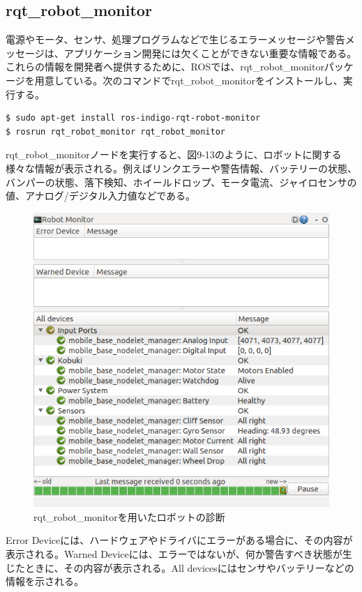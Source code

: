 \begin{itemize}
\subsection{rqt\_robot\_monitor}

電源やモータ、センサ、処理プログラムなどで生じるエラーメッセージや警告メッセージは、アプリケーション開発には欠くことができない重要な情報である。これらの情報を開発者へ提供するために、ROSでは、rqt\_robot\_monitorパッケージを用意している。次のコマンドでrqt\_robot\_monitorをインストールし、実行する。

\begin{lstlisting}[language=ROS]
$ sudo apt-get install ros-indigo-rqt-robot-monitor
$ rosrun rqt_robot_monitor rqt_robot_monitor
\end{lstlisting}

rqt\_robot\_monitorノードを実行すると、図9-13のように、ロボットに関する様々な情報が表示される。例えばリンクエラーや警告情報、バッテリーの状態、バンパーの状態、落下検知、ホイールドロップ、モータ電流、ジャイロセンサの値、アナログ/デジタル入力値などである。

\begin{figure}[htp]
  \centering
  \includegraphics[width=12cm]{pictures/chapter9/pic_09_13.png}
  \caption{rqt\_robot\_monitorを用いたロボットの診断}
\end{figure}

Error Deviceには、ハードウェアやドライバにエラーがある場合に、その内容が表示される。Warned Deviceには、エラーではないが、何か警告すべき状態が生じたときに、その内容が表示される。All devicesにはセンサやバッテリーなどの情報を示される。


\end{itemize}
